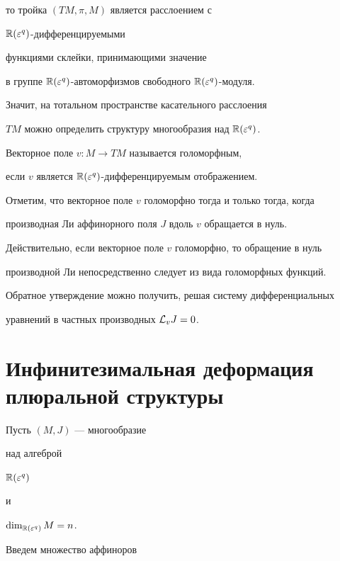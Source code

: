 то тройка $(TM, \pi , M)$ является расслоением с


${\Bbb R}(\varepsilon^q)$-дифференцируемыми


функциями склейки, принимающими значение


в группе $\Bbb R(\varepsilon^q)$-авто\-мор\-физ\-мов свободного $\Bbb R(\varepsilon^q)$-модуля.


Значит, на тотальном пространстве касательного расслоения


$TM$ можно определить структуру многообразия над $\Bbb R(\varepsilon^q)$.





\begin{defn}


Векторное поле $v: M \to TM$ называется голоморфным,


если $v$ является  $\Bbb R(\varepsilon^q)$-дифференцируемым отображением.


\end{defn}





Отметим, что векторное поле $v$ голоморфно тогда и только тогда, когда


производная Ли аффинорного поля $J$ вдоль $v$ обращается в нуль.


Действительно, если векторное поле $v$ голоморфно, то обращение в нуль


производной Ли непосредственно следует из вида голоморфных функций.


Обратное утверждение можно получить, решая систему дифференциальных


уравнений в частных производных ${\cal L}_{v}J=0 $.





\section{Инфинитезимальная деформация плюральной структуры}





Пусть $(M, J)$ --- многообразие


над алгеброй


${\Bbb R} (\varepsilon^{q})$


и


$\dim_{\Bbb R(\varepsilon^q)} M=n$.


Введем множество аффиноров


$$


